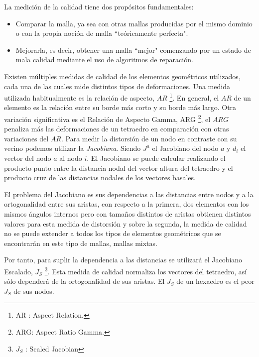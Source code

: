 La medición de la calidad tiene dos propósitos fundamentales: 

\begin{itemize}
	\item Comparar la malla, ya sea con otras mallas producidas por el mismo dominio o con la propia noción de malla ``teóricamente perfecta".
	\item Mejorarla, es decir, obtener una malla ``mejor" comenzando por un estado de mala calidad mediante el uso de algoritmos de reparación.
\end{itemize}


Existen múltiples medidas de calidad de los elementos geométricos utilizados, cada una de las cuales mide distintos tipos de deformaciones.
Una medida utilizada habitualmente es la relación de aspecto, $AR$ \footnote{ AR : Aspect Relation.}. En general, el $AR$ de un elemento es la relación entre su borde más corto y su borde más largo. Otra variación significativa es el Relación de Aspecto Gamma, ARG \footnote{ARG: Aspect Ratio Gamma.}, el $ARG$ penaliza más las deformaciones de un tetraedro en comparación con otras variaciones del $AR$.
Para medir la distorsión de un nodo en contraste con su vecino podemos utilizar la \textit{Jacobiana}. Siendo $J^a$ el Jacobiano del nodo $a$ y $d_i$ el vector del nodo $a$ al nodo $i$. El Jacobiano se puede calcular realizando el producto punto entre la distancia nodal del vector altura del tetraedro y el producto cruz de las distancias nodales de los vectores basales.

El problema del Jacobiano es sus dependencias a las distancias entre nodos y a la ortogonalidad entre sus aristas, con respecto a la primera, dos elementos con los mismos ángulos internos pero con tamaños distintos de aristas obtienen distintos valores para esta medida de distorsión y sobre la segunda, la medida de calidad no se puede extender a todos los tipos de elementos geométricos que se encontrarán en este tipo de mallas, mallas mixtas.

Por tanto, para suplir la dependencia a las distancias se utilizará el Jacobiano Escalado, $J_S$ \footnote{$J_S$ : Scaled Jacobian}.
Esta medida de calidad normaliza los vectores del tetraedro, así sólo dependerá de la ortogonalidad de sus aristas.
El $J_S$ de un hexaedro es el peor $J_S$ de sus nodos. 

